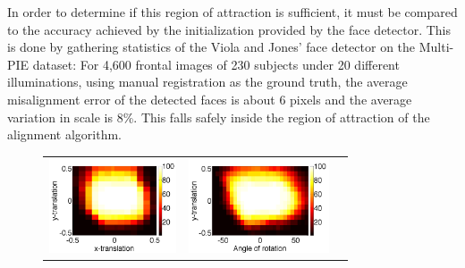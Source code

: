 In order to determine if this region of attraction is sufficient,
it must be compared to the accuracy achieved by the initialization
provided by the face detector.  This is done by gathering statistics 
of the Viola and Jones'
 face detector on the Multi-PIE dataset: For 4,600 frontal
 images of 230 subjects under 20 different illuminations,
 using manual registration as the ground truth, the average
 misalignment error of the detected faces is about 6 pixels
 and the average variation in scale is 8\%. This falls
 safely inside the region of attraction of the alignment
 algorithm.
\newcommand{\tempheighta}[0]{1.1in}
\newcommand{\tempheightb}[0]{0.9in}
\begin{figure}
\centering
{
\begin{tabular}{ccc}
\includegraphics[height=\tempheighta]{figures_pami/x_y_roa.png} &
\includegraphics[height=\tempheighta]{figures_pami/y_theta_roa.png} &

\end{tabular}}
\end{figure}
